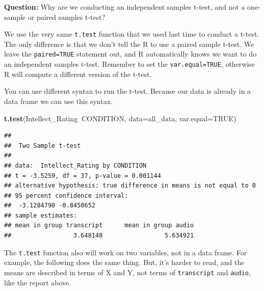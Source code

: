 \documentclass[]{book}
\newenvironment{Shaded}{\begin{snugshade}}{\end{snugshade}}
\newcommand{\KeywordTok}[1]{\textcolor[rgb]{0.13,0.29,0.53}{\textbf{#1}}}
\newcommand{\DataTypeTok}[1]{\textcolor[rgb]{0.13,0.29,0.53}{#1}}
\newcommand{\StringTok}[1]{\textcolor[rgb]{0.31,0.60,0.02}{#1}}
\newcommand{\OtherTok}[1]{\textcolor[rgb]{0.56,0.35,0.01}{#1}}
\newcommand{\OperatorTok}[1]{\textcolor[rgb]{0.81,0.36,0.00}{\textbf{#1}}}
\newcommand{\NormalTok}[1]{#1}
\begin{document}
\textbf{Question:} Why are we conducting an independent samples t-test,
and not a one-sample or paired samples t-test?

We use the very same \texttt{t.test} function that we used last time to
conduct a t-test. The only difference is that we don't tell the R to use
a paired sample t-test. We leave the \texttt{paired=TRUE} statement out,
and R automatically knows we want to do an independent samples t-test.
Remember to set the \texttt{var.equal=TRUE}, otherwise R will compute a
different version of the t-test.

You can use different syntax to run the t-test. Because our data is
already in a data frame we can use this syntax.

\begin{Shaded}
\begin{Highlighting}[]
\KeywordTok{t.test}\NormalTok{(Intellect_Rating}\OperatorTok{~}\NormalTok{CONDITION, }\DataTypeTok{data=}\NormalTok{all_data, }\DataTypeTok{var.equal=}\OtherTok{TRUE}\NormalTok{)}
\end{Highlighting}
\end{Shaded}

\begin{verbatim}
## 
##  Two Sample t-test
## 
## data:  Intellect_Rating by CONDITION
## t = -3.5259, df = 37, p-value = 0.001144
## alternative hypothesis: true difference in means is not equal to 0
## 95 percent confidence interval:
##  -3.1284798 -0.8450652
## sample estimates:
## mean in group transcript      mean in group audio 
##                 3.648148                 5.634921
\end{verbatim}

The \texttt{t.test} function also will work on two variables, not in a
data frame. For example, the following does the same thing. But, it's
harder to read, and the means are described in terms of X and Y, not
terms of \texttt{transcript} and \texttt{audio}, like the report above.

\begin{Shaded}
\end{Shaded}
\end{document}
